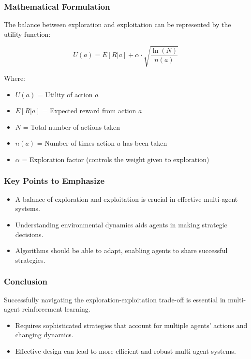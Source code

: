\documentclass[aspectratio=169]{beamer}
\begin{document}
\begin{frame}[fragile]
    \frametitle{Mathematical Formulation}
    The balance between exploration and exploitation can be represented by the utility function:
    
    \begin{equation}
        U(a) = E[R | a] + \alpha \cdot \sqrt{\frac{\ln(N)}{n(a)}}
    \end{equation}
    
    Where:
    \begin{itemize}
        \item $U(a)$ = Utility of action $a$
        \item $E[R | a]$ = Expected reward from action $a$
        \item $N$ = Total number of actions taken
        \item $n(a)$ = Number of times action $a$ has been taken
        \item $\alpha$ = Exploration factor (controls the weight given to exploration)
    \end{itemize}
\end{frame}

\begin{frame}[fragile]
    \frametitle{Key Points to Emphasize}
    \begin{itemize}
        \item A balance of exploration and exploitation is crucial in effective multi-agent systems.
        \item Understanding environmental dynamics aids agents in making strategic decisions.
        \item Algorithms should be able to adapt, enabling agents to share successful strategies.
    \end{itemize}
\end{frame}

\begin{frame}[fragile]
    \frametitle{Conclusion}
    Successfully navigating the exploration-exploitation trade-off is essential in multi-agent reinforcement learning. 
    \begin{itemize}
        \item Requires sophisticated strategies that account for multiple agents' actions and changing dynamics.
        \item Effective design can lead to more efficient and robust multi-agent systems.
    \end{itemize}
\end{frame}
\end{document}
